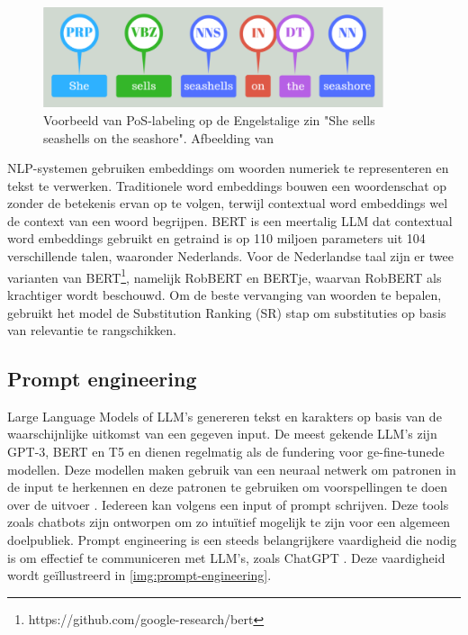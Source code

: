 \begin{figure}[H]
	\begin{center}
		\includegraphics[width=10cm]{img/poslabeling.png}
	\end{center}
	\caption{Voorbeeld van PoS-labeling op de Engelstalige zin "She sells seashells on the seashore". Afbeelding van \textcite{Bilisci2021} }
	\label{fig:pos-labeling}
\end{figure}

NLP-systemen gebruiken embeddings om woorden numeriek te representeren en tekst te verwerken. Traditionele word embeddings bouwen een woordenschat op zonder de betekenis ervan op te volgen, terwijl contextual word embeddings wel de context van een woord begrijpen. BERT is een meertalig LLM dat contextual word embeddings gebruikt en getraind is op 110 miljoen parameters uit 104 verschillende talen, waaronder Nederlands. Voor de Nederlandse taal zijn er twee varianten van BERT\footnote{https://github.com/google-research/bert}, namelijk RobBERT en BERTje, waarvan RobBERT als krachtiger wordt beschouwd. Om de beste vervanging van woorden te bepalen, gebruikt het model de Substitution Ranking (SR) stap om substituties op basis van relevantie te rangschikken. 

\subsection{Prompt engineering}

Large Language Models of LLM's genereren tekst en karakters op basis van de waarschijnlijke uitkomst van een gegeven input. De meest gekende LLM's zijn GPT-3, BERT en T5 en dienen regelmatig als de fundering voor ge-fine-tunede modellen. Deze modellen maken gebruik van een neuraal netwerk om patronen in de input te herkennen en deze patronen te gebruiken om voorspellingen te doen over de uitvoer \autocite{Liu2020}. Iedereen kan volgens \textcite{McFarland2023} een input of prompt schrijven. Deze tools zoals chatbots zijn ontworpen om zo intuïtief mogelijk te zijn voor een algemeen doelpubliek. Prompt engineering is een steeds belangrijkere vaardigheid die nodig is om effectief te communiceren met LLM’s, zoals ChatGPT \autocite{Harwell2023}. Deze vaardigheid wordt geïllustreerd in \ref{img:prompt-engineering}.

